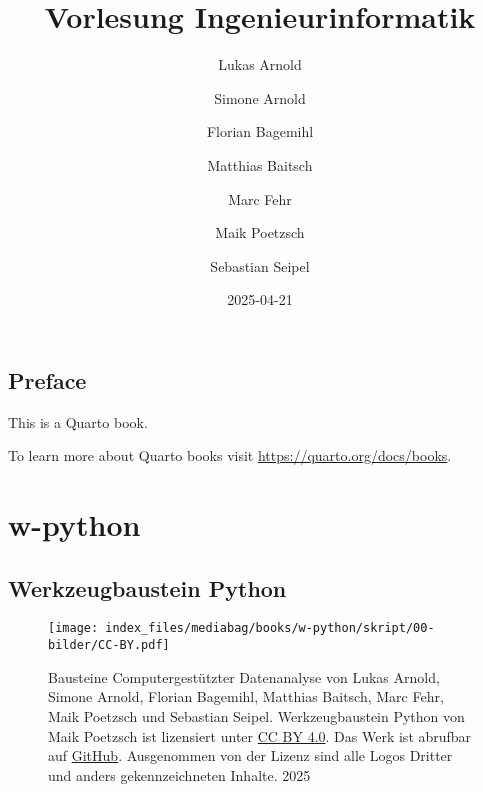 \documentclass[
  letterpaper,
  DIV=11,
  numbers=noendperiod]{scrreprt}
\title{Vorlesung Ingenieurinformatik}
\author{Lukas Arnold \and Simone Arnold \and Florian
Bagemihl \and Matthias Baitsch \and Marc Fehr \and Maik
Poetzsch \and Sebastian Seipel}
\date{2025-04-21}
\renewcommand*\contentsname{Table of contents}
\newcommand\contentsname{Table of contents}
\begin{document}
\maketitle

\renewcommand*\contentsname{Table of contents}
{
\hypersetup{linkcolor=}
\setcounter{tocdepth}{2}
\tableofcontents
}


\chapter*{Preface}\label{preface}


This is a Quarto book.

To learn more about Quarto books visit
\url{https://quarto.org/docs/books}.

\part{w-python}

\chapter*{Werkzeugbaustein Python}\label{werkzeugbaustein-python}


\label{Lizenz}
\begin{figure}

\begin{minipage}{0.20\linewidth}
\texttt{[image: index\_files/mediabag/books/w-python/skript/00-bilder/CC-BY.pdf]}\end{minipage}%
%
\begin{minipage}{0.80\linewidth}
Bausteine Computergestützter Datenanalyse von Lukas Arnold, Simone
Arnold, Florian Bagemihl, Matthias Baitsch, Marc Fehr, Maik Poetzsch und
Sebastian Seipel. Werkzeugbaustein Python von Maik Poetzsch ist
lizensiert unter
\href{https://creativecommons.org/licenses/by/4.0/deed.de}{CC BY 4.0}.
Das Werk ist abrufbar auf
\href{https://github.com/bausteine-der-datenanalyse/w-python}{GitHub}.
Ausgenommen von der Lizenz sind alle Logos Dritter und anders
gekennzeichneten Inhalte. 2025\end{minipage}%

\end{figure}%
\end{document}
